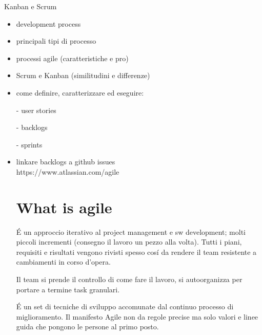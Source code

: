 \begin{tcolorbox}
	\begin{center}
		Kanban e Scrum
	\end{center}
\end{tcolorbox}

\begin{itemize}
	\item development process\\
	\item principali tipi di processo\\
	\item	processi agile (caratteristiche e pro)\\
	\item Scrum e Kanban (similitudini e differenze)\\
	\item	come definire, caratterizzare ed eseguire:\\
		\item[-] user stories\\
		\item[-] backlogs\\
		\item[-] sprints\\
	\item linkare backlogs a github issues\\
https://www.atlassian.com/agile
\section{What is agile}
\'E un approccio iterativo al project management e sw development;
molti piccoli incrementi (consegno il lavoro un pezzo alla volta). 
Tutti i piani, requisiti e risultati vengono rivisti spesso cos\'i da rendere 
il team resistente a cambiamenti in corso d'opera.

Il team si prende il controllo di come fare il lavoro, si autoorganizza per 
portare a termine task granulari.

\'E un set di tecniche di sviluppo accomunate dal continuo processo di 
miglioramento. Il manifesto Agile non da regole precise ma solo valori e 
linee guida che pongono le persone al primo posto.


\end{itemize}
